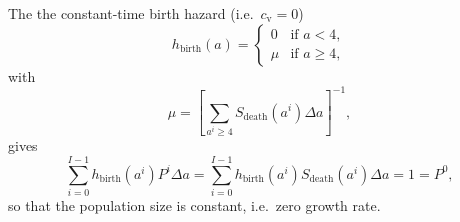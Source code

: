 \documentclass[12pt]{article}
\begin{document}
The the constant-time birth hazard
(i.e.~$c_{\mathrm{v}} = 0$)
\begin{equation}
  h_{\text{birth}}(a) =
  \begin{cases}
    0 & \text{if $a < 4$}, \\
    \mu & \text{if $a \geq 4$},
  \end{cases}
\end{equation}
with
\begin{equation}
  \mu =
  \left[
    \sum_{a^i \geq 4}
    S_{\text{death}}(a^i)
    \Delta a
  \right]^{-1},
\end{equation}
gives
\begin{equation}
  \sum_{i = 0}^{I - 1}
  h_{\text{birth}}(a^i) P^i
  \Delta a
  = \sum_{i = 0}^{I - 1}
  h_{\text{birth}}(a^i) S_{\text{death}}(a^i)
  \Delta a
  = 1 = P^0,
\end{equation}
so that the population size is constant, i.e.~zero growth rate.
\end{document}

